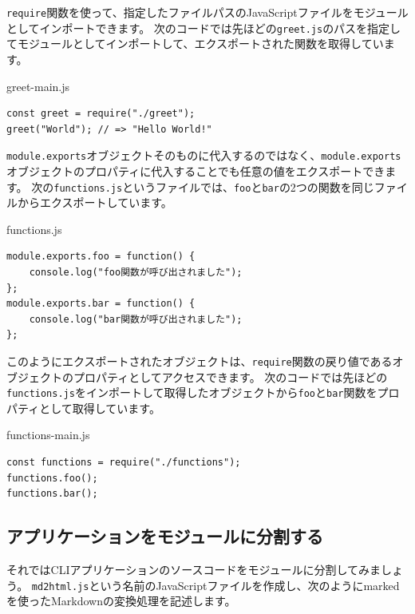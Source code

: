 \texttt{require}関数を使って、指定したファイルパスのJavaScriptファイルをモジュールとしてインポートできます。
次のコードでは先ほどの\texttt{greet.js}のパスを指定してモジュールとしてインポートして、エクスポートされた関数を取得しています。

\begin{listtitle}
greet-main.js
\end{listtitle}
\begin{lstlisting}
const greet = require("./greet");
greet("World"); // => "Hello World!"
\end{lstlisting}
\listend

\texttt{module.exports}オブジェクトそのものに代入するのではなく、\texttt{module.exports}オブジェクトのプロパティに代入することでも任意の値をエクスポートできます。
次の\texttt{functions.js}というファイルでは、\texttt{foo}と\texttt{bar}の2つの関数を同じファイルからエクスポートしています。

\begin{listtitle}
functions.js
\end{listtitle}
\begin{lstlisting}
module.exports.foo = function() {
    console.log("foo関数が呼び出されました");
};
module.exports.bar = function() {
    console.log("bar関数が呼び出されました");
};
\end{lstlisting}
\listend

このようにエクスポートされたオブジェクトは、\texttt{require}関数の戻り値であるオブジェクトのプロパティとしてアクセスできます。
次のコードでは先ほどの\texttt{functions.js}をインポートして取得したオブジェクトから\texttt{foo}と\texttt{bar}関数をプロパティとして取得しています。

\begin{listtitle}
functions-main.js
\end{listtitle}
\begin{lstlisting}
const functions = require("./functions");
functions.foo();
functions.bar();
\end{lstlisting}
\listend

\hypertarget{split-script}{%
\subsection{アプリケーションをモジュールに分割する}\label{split-script}}

それではCLIアプリケーションのソースコードをモジュールに分割してみましょう。
\texttt{md2html.js}という名前のJavaScriptファイルを作成し、次のようにmarkedを使ったMarkdownの変換処理を記述します。


